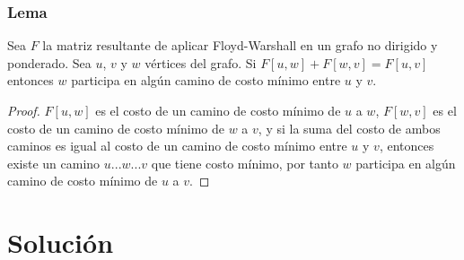 \documentclass{article}
\begin{document}
\subsubsection*{Lema}
Sea $F$ la matriz resultante de aplicar Floyd-Warshall en un grafo no dirigido y ponderado.
Sea $u$, $v$ y $w$ vértices del grafo. Si $F[u,w] + F[w,v] = F[u,v]$ entonces $w$ participa en algún camino
de costo mínimo entre $u$ y $v$.

\begin{proof}
    $F[u,w]$ es el costo de un camino de costo mínimo de $u$ a $w$, 
    $F[w,v]$ es el costo de un camino de costo mínimo de $w$ a $v$, y si la suma del costo de ambos caminos es 
    igual al costo de un camino de costo mínimo entre $u$ y $v$, entonces existe un camino $u...w...v$ que tiene costo
    mínimo, por tanto $w$ participa en algún camino de costo mínimo de $u$ a $v$. 
\end{proof}

\section*{Solución}
\end{document}
